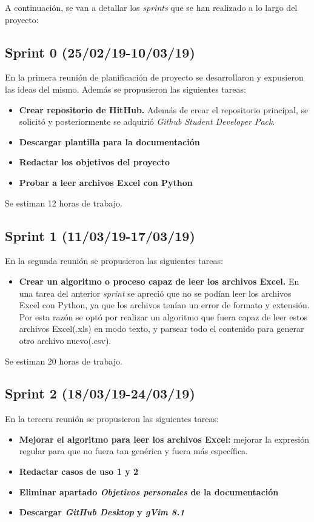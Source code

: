 A continuación, se van a detallar los \emph{sprints} que se han realizado a lo largo del proyecto:

\subsection{Sprint 0 (25/02/19-10/03/19)}
En la primera reunión de planificación de proyecto se desarrollaron y expusieron las ideas del mismo. Además se propusieron las siguientes tareas:

\begin{itemize}
\item
\textbf{Crear repositorio de HitHub.} Además de crear el repositorio principal, se solicitó y posteriormente se adquirió \emph{Github Student Developer Pack}.
\item
\textbf{Descargar plantilla para la documentación}
\item
\textbf{Redactar los objetivos del proyecto}
\item
\textbf{Probar a leer archivos Excel con Python}  
\end{itemize}

Se estiman 12 horas de trabajo.


\subsection{Sprint 1 (11/03/19-17/03/19)}
En la segunda reunión se propusieron las siguientes tareas:

\begin{itemize}
\item
\textbf{Crear un algoritmo o proceso capaz de leer los archivos Excel.} En una tarea del anterior \emph{sprint} se apreció que no se podían leer los archivos Excel con Python, ya que los archivos tenían un error de formato y extensión. Por esta razón se optó por realizar un algoritmo que fuera capaz de leer estos archivos Excel(.xls) en modo texto, y parsear todo el contenido para generar otro archivo nuevo(.csv).
\end{itemize}

Se estiman 20 horas de trabajo.


\subsection{Sprint 2 (18/03/19-24/03/19)} 
En la tercera reunión se propusieron las siguientes tareas:

\begin{itemize}
\item
\textbf{Mejorar el algoritmo para leer los archivos Excel:} mejorar la expresión regular para que no fuera tan genérica y fuera más específica.
\item
\textbf{Redactar casos de uso 1 y 2}
\item
\textbf{Eliminar apartado \emph{Objetivos personales} de la documentación}
\item
\textbf{Descargar \emph{GitHub Desktop} y \emph{gVim 8.1}}
\end{itemize}

